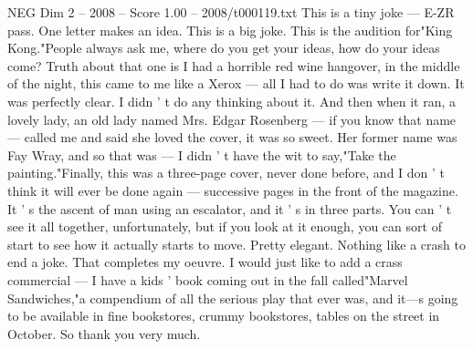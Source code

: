 \begin{textsample}{NEG Dim 2 – 2008 – Score 1.00 – 2008/t000119.txt}
This is a tiny joke — E-ZR pass.
One letter makes an idea.
This is a big joke.
This is the audition for"King Kong."People always ask me, where do you get your ideas, how do your ideas come?
Truth about that one is I had a horrible red wine hangover, in the middle of the night, this came to me like a Xerox — all I had to do was write it down.
It was perfectly clear.
I didn ' t do any thinking about it.
And then when it ran, a lovely lady, an old lady named Mrs.
Edgar Rosenberg — if you know that name — called me and said she loved the cover, it was so sweet.
Her former name was Fay Wray, and so that was — I didn ' t have the wit to say,"Take the painting."Finally, this was a three-page cover, never done before, and I don ' t think it will ever be done again — successive pages in the front of the magazine.
It ' s the ascent of man using an escalator, and it ' s in three parts.
You can ' t see it all together, unfortunately, but if you look at it enough, you can sort of start to see how it actually starts to move.
Pretty elegant.
Nothing like a crash to end a joke.
That completes my oeuvre.
I would just like to add a crass commercial — I have a kids ' book coming out in the fall called"Marvel Sandwiches,"a compendium of all the serious play that ever was, and it—s going to be available in fine bookstores, crummy bookstores, tables on the street in October.
So thank you very much.

\end{textsample}
